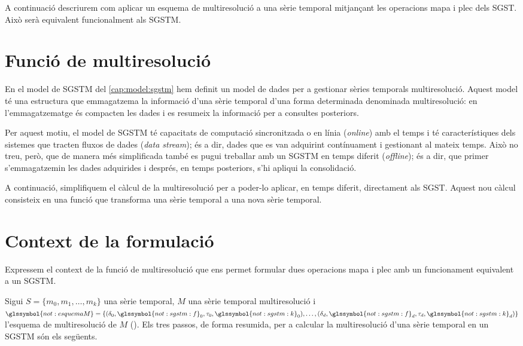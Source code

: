 A continuació descriurem com aplicar un esquema de
multiresolució a una sèrie temporal mitjançant les operacions mapa i
plec dels \gls{SGST}. Això serà equivalent funcionalment als
\gls{SGSTM}.



\section{Funció de multiresolució}
\label{sec:multiresolucio:funcio}



En el model de \gls{SGSTM} del \autoref{cap:model:sgstm} hem definit
un model de dades per a gestionar sèries temporals
multiresolució. Aquest model té una estructura que emmagatzema la
informació d'una sèrie temporal d'una forma determinada denominada
multiresolució: en l'emmagatzematge és compacten les dades i es
resumeix la informació per a consultes posteriors.

Per aquest motiu, el model de \gls{SGSTM} té capacitats de computació
sincronitzada o en línia (\emph{online}) amb el temps i té
característiques dels sistemes que tracten fluxos de dades (\emph{data
  stream}); és a dir, dades que es van adquirint contínuament i 
gestionant al mateix temps. Això no treu, però,
que de manera més simplificada també es pugui treballar amb un
\gls{SGSTM} en temps diferit (\emph{offline}); és a dir, que primer
s'emmagatzemin les dades adquirides i després, en temps posteriors,
s'hi apliqui la consolidació.



A continuació, simplifiquem el càlcul de la multiresolució per a
poder-lo aplicar, en temps diferit, directament als \gls{SGST}.
Aquest nou càlcul consisteix en una funció que transforma una sèrie
temporal a una nova sèrie temporal. 





\section{Context de la formulació}

Expressem el context de la funció de multiresolució que ens permet
formular dues operacions mapa i plec amb un funcionament equivalent a
un \gls{SGSTM}.
%

Sigui $S=\{m_0,m_1,\dotsc,m_k\}$ una sèrie temporal, $M$ una sèrie
temporal multiresolució i $\glssymbol{not:esquemaM} = \{
(\delta_0,\glssymbol{not:sgstm:f}_0,\tau_0,\glssymbol{not:sgstm:k}_0),
\ldots,
(\delta_d,\glssymbol{not:sgstm:f}_d,\tau_d,\glssymbol{not:sgstm:k}_d)\}$
 l'esquema de multiresolució de $M$
().  Els tres passos, de forma resumida, per
a calcular la multiresolució d'una sèrie temporal en un \gls{SGSTM}
són els següents.

